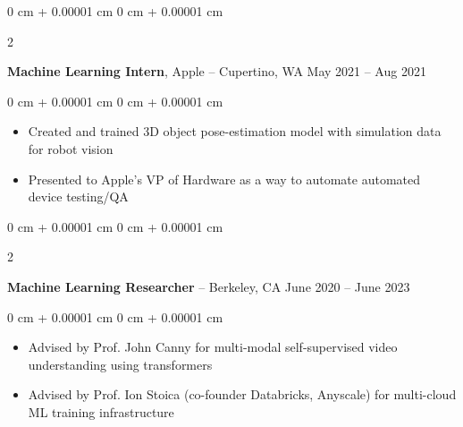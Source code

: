 \documentclass[10pt, letterpaper]{article}
\newenvironment{highlights}{
    \begin{itemize}[
        topsep=0.10 cm,
        parsep=0.10 cm,
        partopsep=0pt,
        itemsep=0pt,
        leftmargin=0 cm + 10pt
    ]
}{
    \end{itemize}
} %
\newenvironment{onecolentry}{
    \begin{adjustwidth}{
        0 cm + 0.00001 cm
    }{
        0 cm + 0.00001 cm
    }
}{
    \end{adjustwidth}
} %
\newenvironment{twocolentry}[2][]{
    \onecolentry
    \def\secondColumn{#2}
    \setcolumnwidth{\fill, 4.5 cm}
    \begin{paracol}{2}
}{
    \switchcolumn \raggedleft \secondColumn
    \end{paracol}
    \endonecolentry
} %
\begin{document}
        \vspace{0.2 cm}

        \begin{twocolentry}{
            May 2021 – Aug 2021
        }
            \textbf{Machine Learning Intern}, Apple -- Cupertino, WA\end{twocolentry}

        \vspace{0.10 cm}
        \begin{onecolentry}
            \begin{highlights}
                \item Created and trained 3D object pose-estimation model with simulation data for robot vision
                \item Presented to Apple's VP of Hardware as a way to automate automated device testing/QA
            \end{highlights}
        \end{onecolentry}

        \vspace{0.2 cm}

        \begin{twocolentry}{
            June 2020 – June 2023
        }
            \textbf{Machine Learning Researcher} -- Berkeley, CA\end{twocolentry}

        \vspace{0.10 cm}
        \begin{onecolentry}
            \begin{highlights}
                \item Advised by Prof. John Canny for multi-modal self-supervised video understanding using transformers
                \item Advised by Prof. Ion Stoica (co-founder Databricks, Anyscale) for multi-cloud ML training infrastructure
            \end{highlights}
        \end{onecolentry}

        \vspace{0.3 cm}

    
\end{document}
